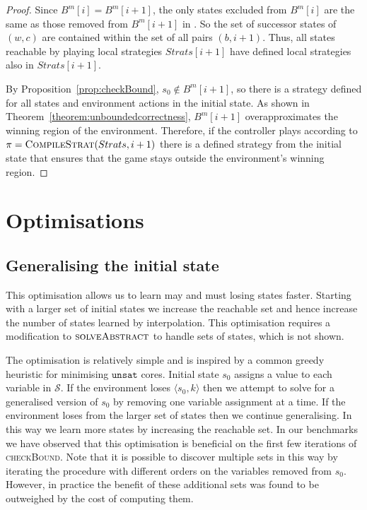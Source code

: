 \begin{proof}
    Since $B^m[i] = B^m[i+1]$, the only states excluded from $B^m[i]$ are the same as those removed from $B^m[i+1]$ in . So the set of successor states of $(w, c)$ are contained within the set of all pairs $(b, i+1)$.  Thus, all states reachable by playing local strategies $Strats[i+1]$ have defined local strategies also in $Strats[i+1]$.

    By Proposition~\ref{prop:checkBound}, $s_0 \not\in B^m[i+1]$, so there is a strategy defined for all states and environment actions in the initial state.  As shown in Theorem~\ref{theorem:unboundedcorrectness}, $B^m[i+1]$ overapproximates the winning region of the environment.  Therefore, if the controller plays according to $\pi = \textsc{CompileStrat}(Strats, i+1)$ there is a defined strategy from the initial state that ensures that the game stays outside the environment's winning region.
\end{proof}

\section{Optimisations}

\subsection{Generalising the initial state}

This optimisation allows us to learn may and must losing states faster.  Starting with a larger set of initial states we increase the reachable set and hence increase the number of states learned by interpolation. This optimisation requires a modification to $\textsc{solveAbstract}$ to handle sets of states, which is not shown.

The optimisation is relatively simple and is inspired by a common greedy heuristic for minimising $\texttt{unsat}$ cores. Initial state $s_0$ assigns a value to each variable in $\mathcal{S}$. If the environment loses $\langle s_0, k \rangle$ then we attempt to solve for a generalised version of $s_0$ by removing one variable assignment at a time. If the environment loses from the larger set of states then we continue generalising. In this way we learn more states by increasing the reachable set. In our benchmarks we have observed that this optimisation is beneficial on the first few iterations of \textsc{checkBound}. Note that it is possible to discover multiple sets in this way by iterating the procedure with different orders on the variables removed from $s_0$. However, in practice the benefit of these additional sets was found to be outweighed by the cost of computing them.

